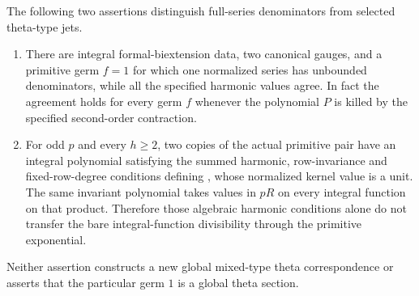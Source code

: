 \begin{proposition}\label{DP39}
The following two assertions distinguish full-series denominators from selected theta-type jets.
\begin{enumerate}[leftmargin=*,label=(\alph*)]
\item There are integral formal-biextension data, two canonical gauges, and a primitive germ $f=1$ for which one normalized series has unbounded denominators, while all the specified harmonic values agree. In fact the agreement holds for every germ $f$ whenever the polynomial $P$ is killed by the specified second-order contraction.
\item For odd $p$ and every $h\ge2$, two copies of the actual primitive pair have an integral polynomial satisfying the summed harmonic, row-invariance and fixed-row-degree conditions defining , whose normalized kernel value is a unit. The same invariant polynomial takes values in $pR$ on every integral function on that product. Therefore those algebraic harmonic conditions alone do not transfer the bare integral-function divisibility through the primitive exponential.
\end{enumerate}
Neither assertion constructs a new global mixed-type theta correspondence or asserts that the particular germ $1$ is a global theta section.
\end{proposition}
